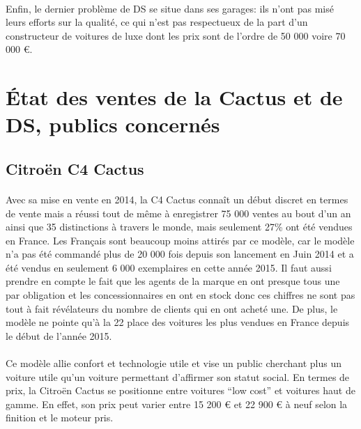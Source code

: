 \documentclass[12pt]{article}\usepackage[]{graphicx}\usepackage[]{color}
\begin{document}
\paragraph{} Enfin, le dernier problème de DS se situe dans ses garages: ils
n'ont pas misé leurs efforts sur la qualité, ce qui n'est pas respectueux de
la part d'un constructeur de voitures de luxe dont les prix sont de l'ordre de
50 000 voire 70 000 €.

\section{État des ventes de la Cactus et de DS, publics concernés}

\subsection{Citroën C4 Cactus}

\paragraph{} Avec sa mise en vente en 2014, la C4 Cactus connaît un début
discret en termes de vente mais a réussi tout de même à enregistrer 75 000
ventes au bout d'un an ainsi que 35 distinctions à travers le
monde\cite{communique}, mais seulement 27\% ont été vendues en France. Les
Français sont beaucoup moins attirés par ce modèle, car le modèle n'a pas été
commandé plus de 20 000 fois depuis son lancement en Juin 2014 et a été vendus
en seulement 6 000 exemplaires en cette année 2015. Il faut aussi prendre en
compte le fait que les agents de la marque en ont presque tous une par
obligation et les concessionnaires en ont en stock donc ces chiffres ne sont
pas tout à fait révélateurs du nombre de clients qui en ont acheté une. De
plus, le modèle ne pointe qu'à la 22\ieme{} place des voitures les plus vendues
en France depuis le début de l'année 2015.

\paragraph{} Ce modèle allie confort et technologie utile et vise un public
cherchant plus un voiture utile qu'un voiture permettant d'affirmer son statut
social. En termes de prix, la Citroën Cactus se positionne entre voitures ``low
cost'' et voitures haut de gamme. En effet, son prix peut varier entre 15 200 €
et 22 900 € à neuf selon la finition et le moteur pris\cite{banquette}.
\end{document}
